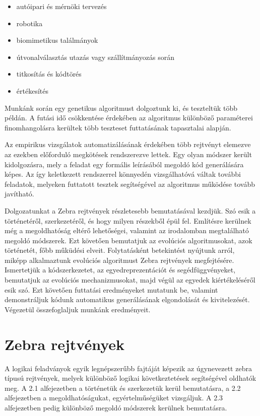 \documentclass[12pt,a4paper,oneside]{report}
\begin{document}

	\begin{itemize}
        \item autóipari és mérnöki tervezés
        \item robotika
        \item biomimetikus találmányok
        \item útvonalválasztás utazás vagy szállítmányozás során
        \item titkosítás és kódtörés
        \item értékesítés
	\end{itemize}

    
    Munkánk során egy genetikus algoritmust dolgoztunk ki, és teszteltük több példán.
    A futási idő csökkentése érdekében az algoritmus különböző paraméterei finomhangolásra kerültek több teszteset futtatásának tapasztalai alapján.

	Az empirikus vizsgálatok automatizálásának érdekében több rejtvényt elemezve az ezekben előforduló megkötések rendszerezve lettek.
    Egy olyan módszer került kidolgozásra, mely a feladat egy formális leírásából megoldó kód generálására képes.
    Az így keletkezett rendszerrel könnyedén vizsgálhatóvá váltak további feladatok, melyeken futtatott tesztek segítségével az algoritmus működése tovább javítható.

	Dolgozatunkat a Zebra rejtvények részletesebb bemutatásával kezdjük.
    Szó esik a történetéről, szerkezetéről, és hogy milyen részekből épül fel.
    Említésre kerülnek még a megoldhatóság eltérő lehetőségei, valamint az irodalomban megtalálható megoldó módszerek.
    Ezt követően bemutatjuk az evolúciós algoritmusokat, azok történetét, főbb műküdési elveit.
    Folytatásként betekintést nyújtunk arról, miképp alkalmaztunk evolúciós algoritmust Zebra rejtvények megfejtésére.
    Ismertetjük a kódszerkezetet, az egyedreprezentációt és segédfüggvényeket, bemutatjuk az evolúciós mechanizmusokat, majd végül az egyedek kiértékeléséről esik szó.
    Ezt követően futtatási eredményeket mutatunk be, valamint demonstráljuk kódunk automatikus generálásának elgondolását és kivitelezését.
    Végezetül összefoglaljuk munkánk eredményeit.

\chapter{Zebra rejtvények} %

A logikai feladványok egyik legnépszerűbb fajtáját képezik az úgynevezett zebra típusú rejtvények, melyek különböző logikai következtetések segítségével oldhatók meg. 
A 2.1 alfejezetben a történetük és szerkezetük kerül bemutatásra, a 2.2 alfejezetben a megoldhatóságukat, egyértelműségüket vizsgáljuk.
A 2.3 alfejezetben pedig különböző megoldó módszerek kerülnek bemutatásra.
    
\end{document}
